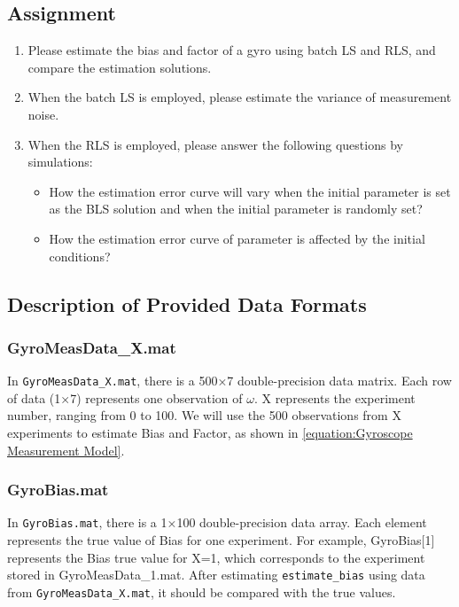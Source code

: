 \documentclass[openany,12pt,UTF8]{article}
\begin{document}
\subsection{Assignment}
\begin{enumerate}
    \item Please estimate the bias and factor of a gyro using batch LS and RLS, and compare the estimation solutions.
    \item When the batch LS is employed, please estimate the variance of measurement noise.
    \item When the RLS is employed, please answer the following questions by simulations:
          \begin{itemize}
              \item How the estimation error curve will vary when the initial parameter is set as the BLS solution and when the initial parameter is randomly set?
              \item How the estimation error curve of parameter is affected by the initial conditions?
          \end{itemize}
\end{enumerate}

\subsection{Description of Provided Data Formats}
\subsubsection{GyroMeasData\_X.mat}
In \texttt{GyroMeasData\_X.mat}, there is a 500×7 double-precision data matrix. Each row of data (1×7) represents one observation of $\omega$. X represents the experiment number, ranging from 0 to 100. We will use the 500 observations from X experiments to estimate Bias and Factor, as shown in \autoref{equation:Gyroscope Measurement Model}.

\subsubsection{GyroBias.mat}
In \texttt{GyroBias.mat}, there is a 1×100 double-precision data array. Each element represents the true value of Bias for one experiment. For example, GyroBias[1] represents the Bias true value for X=1, which corresponds to the experiment stored in GyroMeasData\_1.mat. After estimating \texttt{estimate\_bias} using data from \texttt{GyroMeasData\_X.mat}, it should be compared with the true values.
\end{document}
